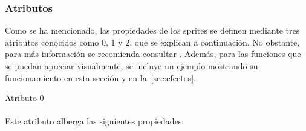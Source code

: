 \subsubsection{Atributos}
Como se ha mencionado, las propiedades de los sprites se definen mediante tres atributos conocidos como 0, 1 y 2, que se explican a continuación. No obstante, para más información se recomienda consultar \cite{bib:gba_manual,bib:tonc}. Además, para las funciones que se puedan apreciar visualmente, se incluye un ejemplo mostrando su funcionamiento en esta sección y en la~\ref{sec:efectos}.

\vspace{1cm}
\underline{Atributo 0} \\ \\
Este atributo alberga las siguientes propiedades:

